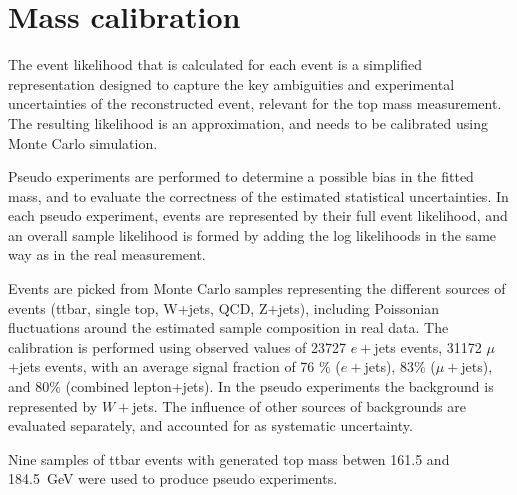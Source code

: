 
\section{Mass calibration}
\label{s_top_mass:calibration}
The event likelihood that is calculated for each event is a simplified representation designed to capture the key
ambiguities and experimental uncertainties of the reconstructed event, relevant for the top mass measurement. The
resulting likelihood is an approximation, and needs to be calibrated using Monte Carlo simulation.

Pseudo experiments are performed to determine a possible bias in the fitted mass, and to evaluate the correctness of the
estimated statistical uncertainties. In each pseudo experiment, events are represented by their full event likelihood,
and an overall sample likelihood is formed by adding the log likelihoods in the same way as in the real measurement.

Events are picked from Monte Carlo samples representing the different sources of events (ttbar, single top, W+jets, QCD,
Z+jets), including Poissonian fluctuations around the estimated sample composition in real data. The calibration is
performed using observed values of 23727 $e+$jets events, 31172 $\mu$+jets events, with an average signal fraction of 76
\% ($e+$jets), 83\% ($\mu+$jets), and 80\% (combined lepton+jets). In the pseudo experiments the background is
represented by $W+$jets.  The influence of other sources of backgrounds are evaluated separately, and accounted for as
systematic uncertainty.

Nine samples of ttbar events with generated top mass betwen 161.5 and 184.5~GeV were used to produce pseudo experiments.




